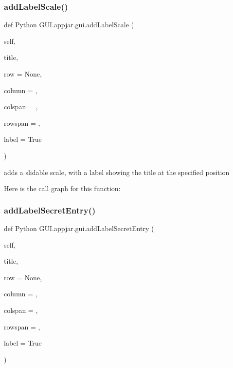 \subsubsection{\texorpdfstring{add\+Label\+Scale()}{addLabelScale()}}
{\footnotesize\ttfamily def Python G\+U\+I.\+appjar.\+gui.\+add\+Label\+Scale (\begin{DoxyParamCaption}\item[{}]{self,  }\item[{}]{title,  }\item[{}]{row = {\ttfamily None},  }\item[{}]{column = {},  }\item[{}]{colspan = {},  }\item[{}]{rowspan = {},  }\item[{}]{label = {\ttfamily True} }\end{DoxyParamCaption})}

\begin{DoxyVerb}adds a slidable scale, with a label showing the title  at the specified position \end{DoxyVerb}
 Here is the call graph for this function\+:
\mbox{\label{class_python_01_g_u_i_1_1appjar_1_1gui_af440b0b3d702c7cef41e08b0620363d0}} 
\subsubsection{\texorpdfstring{add\+Label\+Secret\+Entry()}{addLabelSecretEntry()}}
{\footnotesize\ttfamily def Python G\+U\+I.\+appjar.\+gui.\+add\+Label\+Secret\+Entry (\begin{DoxyParamCaption}\item[{}]{self,  }\item[{}]{title,  }\item[{}]{row = {\ttfamily None},  }\item[{}]{column = {},  }\item[{}]{colspan = {},  }\item[{}]{rowspan = {},  }\item[{}]{label = {\ttfamily True} }\end{DoxyParamCaption})}

